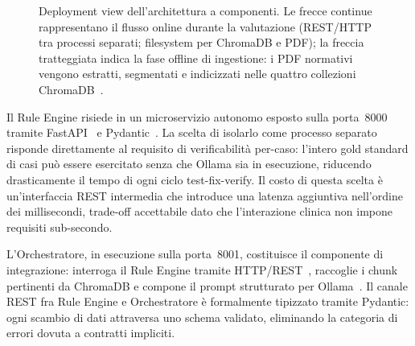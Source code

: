 \begin{figure}[ht]
\caption{Deployment view dell'architettura a componenti. Le frecce continue
  rappresentano il flusso online durante la valutazione (REST/HTTP tra processi
  separati; filesystem per ChromaDB e PDF); la freccia tratteggiata indica
  la fase offline di ingestione: i PDF normativi vengono estratti, segmentati
  e indicizzati nelle quattro collezioni ChromaDB~\cite{chromadb}.}
\label{fig:architettura}
\end{figure}

Il Rule Engine risiede in un microservizio autonomo esposto sulla porta~8000
tramite FastAPI~\cite{fastapi} e Pydantic~\cite{pydantic}.
La scelta di isolarlo come processo separato risponde direttamente al requisito
di verificabilità per-caso: l'intero gold standard di \goldn{} casi
può essere esercitato senza che Ollama sia in esecuzione, riducendo
drasticamente il tempo di ogni ciclo test-fix-verify.
Il costo di questa scelta è un'interfaccia REST intermedia che introduce
una latenza aggiuntiva nell'ordine dei millisecondi, trade-off accettabile
dato che l'interazione clinica non impone requisiti sub-secondo.

L'Orchestratore, in esecuzione sulla porta~8001, costituisce il componente
di integrazione: interroga il Rule Engine tramite HTTP/REST~\cite{fielding2000rest},
raccoglie i chunk pertinenti da ChromaDB e compone il prompt strutturato per
Ollama~\cite{ollama2024}.
Il canale REST fra Rule Engine e Orchestratore è formalmente tipizzato tramite
Pydantic: ogni scambio di dati attraversa uno schema validato, eliminando
la categoria di errori dovuta a contratti impliciti.

